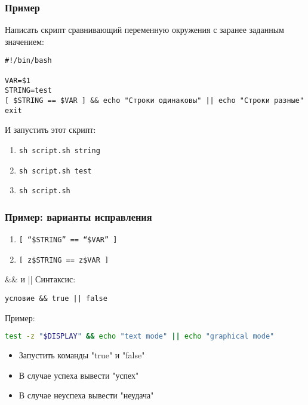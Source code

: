 \begin{frame}[fragile]
	\frametitle{Пример}

	Написать скрипт сравнивающий переменную окружения с заранее заданным значением:
	
	\small\begin{lstlisting}
#!/bin/bash

VAR=$1
STRING=test
[ $STRING == $VAR ] && echo "Строки одинаковы" || echo "Строки разные"
exit
	\end{lstlisting}
    \normalsize
	И запустить этот скрипт:
	
	\begin{enumerate}
		\item {\tt sh script.sh string}
		\item {\tt sh script.sh test}
		\item {\tt sh script.sh}
	\end{enumerate}

\end{frame}

\begin{frame}
	\frametitle{Пример: варианты исправления}

		\begin{enumerate}
			\item {\tt [ ``\$STRING'' == ``\$VAR'' ] }
			\item {\tt [ z\$STRING == z\$VAR ] }
		\end{enumerate}

\end{frame}

\begin{frame}[fragile]{\&\& и ||}
	Синтаксис:
\begin{verbatim}
условие && true || false
\end{verbatim}

	\pause
	Пример:
\begin{lstlisting}[language=bash]
test -z "$DISPLAY" && echo "text mode" || echo "graphical mode"
\end{lstlisting}
	
	\pause

	\begin{itemize}
	    \item Запустить команды "true" и "false"
	    \item В случае успеха вывести "успех"
	    \item В случае неуспеха вывести "неудача"
	\end{itemize}
\end{frame}



